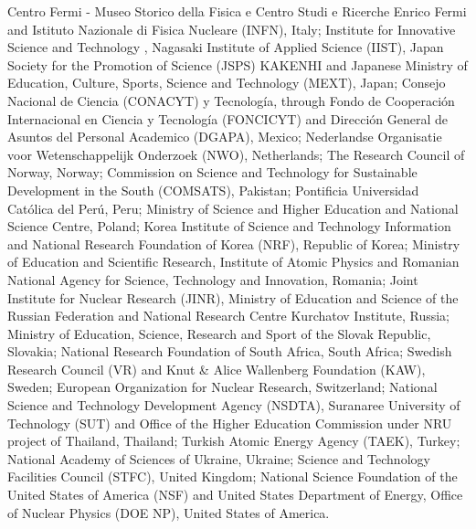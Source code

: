 %
Centro Fermi - Museo Storico della Fisica e Centro Studi e Ricerche Enrico Fermi and Istituto Nazionale di Fisica Nucleare (INFN), Italy;
%
Institute for Innovative Science and Technology , Nagasaki Institute of Applied Science (IIST), Japan Society for the Promotion of Science (JSPS) KAKENHI and Japanese Ministry of Education, Culture, Sports, Science and Technology (MEXT), Japan;
%
Consejo Nacional de Ciencia (CONACYT) y Tecnolog\'{i}a, through Fondo de Cooperaci\'{o}n Internacional en Ciencia y Tecnolog\'{i}a (FONCICYT) and Direcci\'{o}n General de Asuntos del Personal Academico (DGAPA), Mexico;
%
Nederlandse Organisatie voor Wetenschappelijk Onderzoek (NWO), Netherlands;
%
The Research Council of Norway, Norway;
%
Commission on Science and Technology for Sustainable Development in the South (COMSATS), Pakistan;
%
Pontificia Universidad Cat\'{o}lica del Per\'{u}, Peru;
%
Ministry of Science and Higher Education and National Science Centre, Poland;
%
Korea Institute of Science and Technology Information and National Research Foundation of Korea (NRF), Republic of Korea;
%
Ministry of Education and Scientific Research, Institute of Atomic Physics and Romanian National Agency for Science, Technology and Innovation, Romania;
%
Joint Institute for Nuclear Research (JINR), Ministry of Education and Science of the Russian Federation and National Research Centre Kurchatov Institute, Russia;
%
Ministry of Education, Science, Research and Sport of the Slovak Republic, Slovakia;
%
National Research Foundation of South Africa, South Africa;
%
Swedish Research Council (VR) and Knut \& Alice Wallenberg Foundation (KAW), Sweden;
%
European Organization for Nuclear Research, Switzerland;
%
National Science and Technology Development Agency (NSDTA), Suranaree University of Technology (SUT) and Office of the Higher Education Commission under NRU project of Thailand, Thailand;
%
Turkish Atomic Energy Agency (TAEK), Turkey;
%
National Academy of  Sciences of Ukraine, Ukraine;
%
Science and Technology Facilities Council (STFC), United Kingdom;
%
National Science Foundation of the United States of America (NSF) and United States Department of Energy, Office of Nuclear Physics (DOE NP), United States of America.